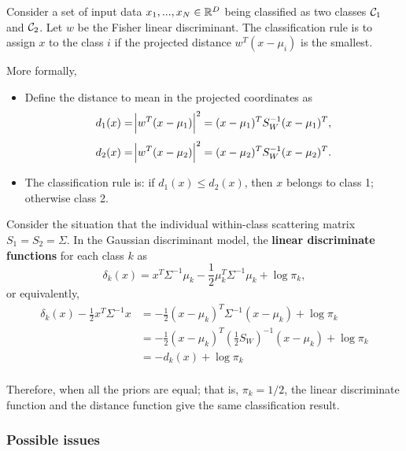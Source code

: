 \begin{refsection}
\begin{method}
	Consider a set of input data $x_1,...,x_N\in \mathbb{R}^D$ being classified as two classes $\mathcal{C}_1$ and $\mathcal{C}_2$. Let $w$ be the Fisher linear discriminant. The classification rule is to assign $x$ to the class $i$ if the projected distance $w^T(x-\mu_i)$ is the smallest.
	
	More formally, 
	\begin{itemize}
		\item  Define the distance to mean in the projected coordinates as
		$$d_1(x) = \abs{w^T(x - \mu_1)}^2 = (x-\mu_1)^TS_W^{-1}(x-\mu_1)^T,$$
		$$d_2(x) = \abs{w^T(x - \mu_2)}^2 = (x-\mu_2)^TS_W^{-1}(x-\mu_2)^T.$$
		\item The classification rule is: if $d_1(x)\leq d_2(x)$, then $x$ belongs to class 1; otherwise class 2.
	\end{itemize}	
\end{method}


\begin{remark} Consider the situation that the individual within-class scattering matrix $S_1 = S_2 = \Sigma$.
	In the Gaussian discriminant model, the \textbf{linear discriminate functions} for each class $k$ as
	$$\delta_k(x) = x^T\Sigma^{-1}\mu_k - \frac{1}{2}\mu_k^T\Sigma^{-1}\mu_k + \log \pi_k,$$
	or equivalently, 
	\begin{align*}
	\delta_k(x) - \frac{1}{2}x^T\Sigma^{-1}x  &= -\frac{1}{2}(x-\mu_k)^T\Sigma^{-1}(x-\mu_k) + \log \pi_k \\
	&= -\frac{1}{2}(x-\mu_k)^T(\frac{1}{2}S_W)^{-1}(x-\mu_k) + \log \pi_k \\
	&= -d_k(x) + \log \pi_k \\
	\end{align*}
	
	Therefore, when all the priors are equal; that is, $\pi_k = 1/2$, the linear discriminate function and the distance function give the same classification result.
\end{remark}




\subsubsection{Possible issues}




\end{refsection}
